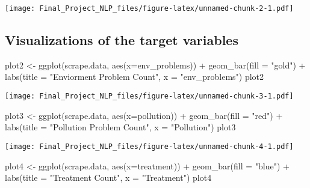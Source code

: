 \documentclass[
]{article}
\newenvironment{Shaded}{\begin{snugshade}}{\end{snugshade}}
\newcommand{\AttributeTok}[1]{\textcolor[rgb]{0.77,0.63,0.00}{#1}}
\newcommand{\FunctionTok}[1]{\textcolor[rgb]{0.00,0.00,0.00}{#1}}
\newcommand{\NormalTok}[1]{#1}
\newcommand{\OtherTok}[1]{\textcolor[rgb]{0.56,0.35,0.01}{#1}}
\newcommand{\SpecialCharTok}[1]{\textcolor[rgb]{0.00,0.00,0.00}{#1}}
\newcommand{\StringTok}[1]{\textcolor[rgb]{0.31,0.60,0.02}{#1}}
\begin{document}
\texttt{[image: Final\_Project\_NLP\_files/figure-latex/unnamed-chunk-2-1.pdf]}

\hypertarget{visualizations-of-the-target-variables}{%
\subsection{Visualizations of the target
variables}\label{visualizations-of-the-target-variables}}

\begin{Shaded}
\begin{Highlighting}[]
\NormalTok{plot2 }\OtherTok{\textless{}{-}} \FunctionTok{ggplot}\NormalTok{(scrape.data, }\FunctionTok{aes}\NormalTok{(}\AttributeTok{x=}\NormalTok{env\_problems)) }\SpecialCharTok{+} \FunctionTok{geom\_bar}\NormalTok{(}\AttributeTok{fill =} \StringTok{"gold"}\NormalTok{) }\SpecialCharTok{+}
  \FunctionTok{labs}\NormalTok{(}\AttributeTok{title =} \StringTok{"Enviorment Problem Count"}\NormalTok{, }\AttributeTok{x =} \StringTok{"env\_problems"}\NormalTok{)}
\NormalTok{plot2}
\end{Highlighting}
\end{Shaded}

\texttt{[image: Final\_Project\_NLP\_files/figure-latex/unnamed-chunk-3-1.pdf]}

\begin{Shaded}
\begin{Highlighting}[]
\NormalTok{plot3 }\OtherTok{\textless{}{-}} \FunctionTok{ggplot}\NormalTok{(scrape.data, }\FunctionTok{aes}\NormalTok{(}\AttributeTok{x=}\NormalTok{pollution)) }\SpecialCharTok{+} \FunctionTok{geom\_bar}\NormalTok{(}\AttributeTok{fill =} \StringTok{"red"}\NormalTok{) }\SpecialCharTok{+}
  \FunctionTok{labs}\NormalTok{(}\AttributeTok{title =} \StringTok{"Pollution Problem Count"}\NormalTok{, }\AttributeTok{x =} \StringTok{"Pollution"}\NormalTok{)}
\NormalTok{plot3}
\end{Highlighting}
\end{Shaded}

\texttt{[image: Final\_Project\_NLP\_files/figure-latex/unnamed-chunk-4-1.pdf]}

\begin{Shaded}
\begin{Highlighting}[]
\NormalTok{plot4 }\OtherTok{\textless{}{-}} \FunctionTok{ggplot}\NormalTok{(scrape.data, }\FunctionTok{aes}\NormalTok{(}\AttributeTok{x=}\NormalTok{treatment)) }\SpecialCharTok{+} \FunctionTok{geom\_bar}\NormalTok{(}\AttributeTok{fill =} \StringTok{"blue"}\NormalTok{) }\SpecialCharTok{+}
  \FunctionTok{labs}\NormalTok{(}\AttributeTok{title =} \StringTok{"Treatment Count"}\NormalTok{, }\AttributeTok{x =} \StringTok{"Treatment"}\NormalTok{)}
\NormalTok{plot4}
\end{Highlighting}
\end{Shaded}
\end{document}
